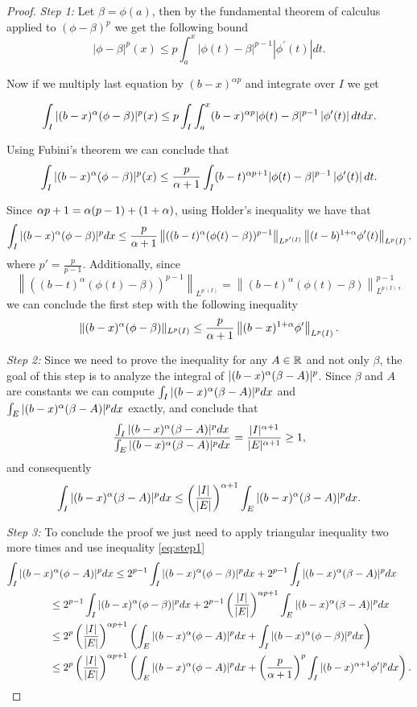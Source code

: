 \begin{proof} \textit{Step 1:}
Let $\beta = \phi(a)$, then by the fundamental theorem of calculus  applied to $(\phi-\beta)^p$ we get the following bound
$$|\phi-\beta|^p(x) \leq p \int_a^x|\phi(t)-\beta|^{p-1}\left|\phi^{\prime}(t)\right| d t .$$

Now if we multiply last equation by $(b-x)^{\alpha p}$ and integrate over $I$ we get

$$\int_I|(b-x)^\alpha(\phi-\beta)|^p(x) \leq p \int_I\int_a^x(b-x)^{\alpha p}|\phi(t)-\beta|^{p-1}\left|\phi^{\prime}(t)\right| d t dx.$$

Using Fubini's theorem we can conclude that
$$\int_I|(b-x)^\alpha(\phi-\beta)|^p(x) \leq \frac{p}{\alpha+1} \int_I(b-t)^{\alpha p+1}|\phi(t)-\beta|^{p-1}\left|\phi^{\prime}(t)\right| d t.$$

Since $\alpha p +1 = \alpha(p-1) + (1+\alpha)$, using Holder's inequality we  have that
$$\int_I|(b-x)^\alpha(\phi-\beta)|^p d x \leq \frac{p}{\alpha+1}\left\|((b-t)^\alpha(\phi(t)-\beta))^{p-1}\right\|_{L^{p^{\prime}(I)}}\left\|(t-b)^{1+\alpha} \phi^{\prime}(t)\right\|_{L^p(I)}.$$
where $p' = \frac{p}{p-1}$. Additionally, since  $$\left\|((b-t)^\alpha(\phi(t)-\beta))^{p-1}\right\|_{L^{p^{\prime}(I)}} = \left\|(b-t)^{\alpha}(\phi(t)-\beta)\right\|^{p-1}_{L^{p(I)}},$$ we can conclude the first step with the following inequality
\begin{equation}
\label{eq:step1}
\|(b-x)^\alpha(\phi-\beta)\|_{L^p(I)} \leq \frac{p}{\alpha+1}\left\|(b-x)^{1+\alpha} \phi^{\prime}\right\|_{L^p(I)}.
\end{equation}


\textit{Step 2:} Since we need to prove the inequality for any $A\in\mathbb{R}$ and not only $\beta$, the goal of this step is to analyze the integral of $|(b-x)^\alpha(\beta-A)|^p$.  Since $\beta$ and $A$ are constants we can compute  $\int_I|(b-x)^\alpha(\beta-A)|^p d x$ and $\int_E|(b-x)^\alpha(\beta-A)|^p d x$ exactly, and conclude that 
$$\frac{\int_I|(b-x)^\alpha(\beta-A)|^p d x}{\int_E|(b-x)^\alpha(\beta-A)|^p d x }=\frac{|I|^{\alpha+1}}{|E|^{\alpha+1}}\geq 1 ,$$ 
and consequently
$$\int_I|(b-x)^\alpha(\beta-A)|^p d x \leq \left(\frac{|I|}{|E|}\right)^{\alpha+1} \int_E|(b-x)^\alpha(\beta-A)|^p d x.$$



\textit{Step 3:} To conclude the proof we just need to apply triangular inequality two more times and use inequality \ref{eq:step1} 
\begin{align*}
    \int_I|(b-x&)^\alpha(\phi-A)|^p d x \leq 2^{p-1}\int_I|(b-x)^\alpha(\phi-\beta)|^p d x + 2^{p-1}\int_I|(b-x)^\alpha(\beta-A)|^p d x\\
     &\leq 2^{p-1}\int_I|(b-x)^\alpha(\phi-\beta)|^p d x + 2^{p-1}\left(\frac{|I|}{|E|}\right)^{\alpha p+1}\int_E|(b-x)^\alpha(\beta-A)|^p d x\\
     &\leq 2^p \left(\frac{|I|}{|E|}\right)^{\alpha p+1}\left(\int_E|(b-x)^\alpha(\phi-A)|^p d x+\int_I|(b-x)^\alpha(\phi-\beta)|^p dx \right)\\
    &\leq 2^p \left(\frac{|I|}{|E|}\right)^{\alpha p+1}\left(\int_E|(b-x)^\alpha(\phi-A)|^p d x+\left(\frac{p}{\alpha+1}\right)^p\int_I|(b-x)^{\alpha+1}\phi'|^p d x\right). 
\end{align*}
\end{proof}

